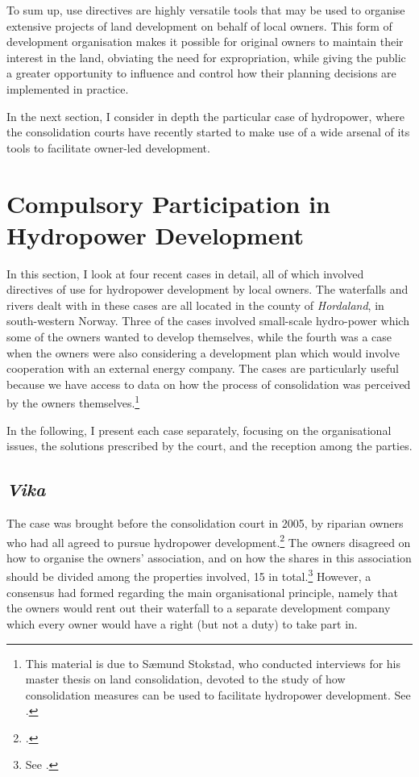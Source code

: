 To sum up, use directives are highly versatile tools that may be used to organise extensive projects of land development on behalf of local owners. This form of development organisation makes it possible for original owners to maintain their interest in the land, obviating the need for expropriation, while giving the public a greater opportunity to influence and control  how their planning decisions are implemented in practice.

In the next section, I consider in depth the particular case of hydropower, where the consolidation courts have recently started to make use of a wide arsenal of its tools to facilitate owner-led development.

\section{Compulsory Participation in Hydropower Development}\label{sec:6:4}

In this section, I look at four recent cases in detail, all of which involved directives of use for hydropower development by local owners. The waterfalls and rivers dealt with in these cases are all located in the county of \emph{Hordaland}, in south-western Norway. Three of the cases involved small-scale hydro-power which some of the owners wanted to develop themselves, while the fourth was a case when the owners were also considering a development plan which would involve cooperation with an external energy company. The cases are particularly useful because we have access to data on how the process of consolidation was perceived by the owners themselves.\footnote{This material is due to Sæmund Stokstad, who conducted interviews for his master thesis on land consolidation, devoted to the study of how consolidation measures can be used to facilitate hydropower development. See \cite{stokstad11}.}

In the following, I present each case separately, focusing on the organisational issues, the solutions prescribed by the court, and the reception among the parties.

\subsection{\emph{Vika}}\label{sec:6:4:1}

The case was brought before the consolidation court in 2005, by riparian owners who had all agreed to pursue hydropower development.\footcite{vika05} The owners disagreed on how to organise the owners' association, and on how the shares in this association should be divided among the properties involved, 15 in total.\footnote{See \cite[25-28]{stokstad11}.} However, a consensus had formed regarding the main organisational principle, namely that the owners would rent out their waterfall to a separate development company which every owner would have a right (but not a duty) to take part in. 

